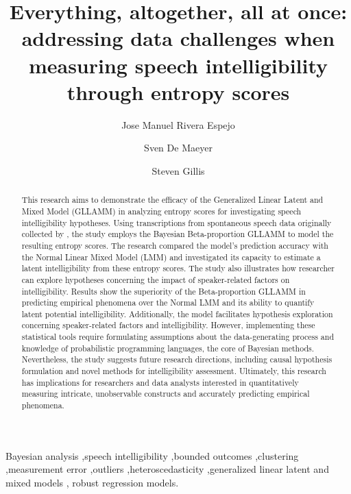 \documentclass[
  authoryear,
  preprint,
  1p]{elsarticle}
\begin{document}
\begin{frontmatter}
\title{Everything, altogether, all at once: addressing data challenges
when measuring speech intelligibility through entropy scores}
\author[1]{Jose Manuel Rivera Espejo%
%
}
\author[1]{Sven De Maeyer%
%
}
\author[2]{Steven Gillis%
%
}





        
\begin{abstract}
{This research aims to demonstrate the efficacy of the Generalized
Linear Latent and Mixed Model (GLLAMM)
\citep{Rabe_et_al_2004a, Rabe_et_al_2004b, Rabe_et_al_2004c, Skrondal_et_al_2004a}
in analyzing entropy scores for investigating speech intelligibility
hypotheses. Using transcriptions from spontaneous speech data originally
collected by \citet{Boonen_et_al_2023}, the study employs the Bayesian
Beta-proportion GLLAMM to model the resulting entropy scores. The
research compared the model's prediction accuracy with the Normal Linear
Mixed Model (LMM) \citep{Holmes_et_al_2019} and investigated its
capacity to estimate a latent intelligibility from these entropy scores.
The study also illustrates how researcher can explore hypotheses
concerning the impact of speaker-related factors on intelligibility.
Results show the superiority of the Beta-proportion GLLAMM in predicting
empirical phenomena over the Normal LMM and its ability to quantify
latent potential intelligibility. Additionally, the model facilitates
hypothesis exploration concerning speaker-related factors and
intelligibility. However, implementing these statistical tools require
formulating assumptions about the data-generating process and knowledge
of probabilistic programming languages, the core of Bayesian methods.
Nevertheless, the study suggests future research directions, including
causal hypothesis formulation and novel methods for intelligibility
assessment. Ultimately, this research has implications for researchers
and data analysts interested in quantitatively measuring intricate,
unobservable constructs and accurately predicting empirical phenomena.}
\end{abstract}





\begin{keyword}
    Bayesian analysis \sep speech intelligibility \sep bounded
outcomes \sep clustering \sep measurement
error \sep outliers \sep heteroscedasticity \sep generalized linear
latent and mixed models \sep 
    robust regression models.
\end{keyword}
\end{frontmatter}
    
\end{document}
